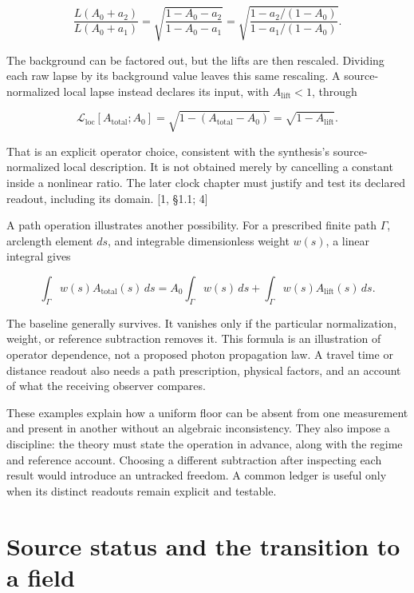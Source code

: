 \documentclass[10pt,twocolumn,letterpaper]{article}
\begin{document}
\begin{equation}
\frac{L(A_0+a_2)}{L(A_0+a_1)}
=\sqrt{\frac{1-A_0-a_2}{1-A_0-a_1}}
=\sqrt{\frac{1-a_2/(1-A_0)}{1-a_1/(1-A_0)}}.
\end{equation}

The background can be factored out, but the lifts are then rescaled. Dividing each raw lapse by its background value leaves this same rescaling. A source-normalized local lapse instead declares its input, with \(A_{\mathrm{lift}}<1\), through

\begin{equation}
\mathcal L_{\mathrm{loc}}[A_{\mathrm{total}};A_0]
=\sqrt{1-(A_{\mathrm{total}}-A_0)}
=\sqrt{1-A_{\mathrm{lift}}}.
\end{equation}

That is an explicit operator choice, consistent with the synthesis's source-normalized local description. It is not obtained merely by cancelling a constant inside a nonlinear ratio. The later clock chapter must justify and test its declared readout, including its domain. {[}1, §1.1; 4{]}

A path operation illustrates another possibility. For a prescribed finite path \(\Gamma\), arclength element \(ds\), and integrable dimensionless weight \(w(s)\), a linear integral gives

\begin{equation}
\int_\Gamma w(s)A_{\mathrm{total}}(s)\,ds
=A_0\int_\Gamma w(s)\,ds
+\int_\Gamma w(s)A_{\mathrm{lift}}(s)\,ds.
\end{equation}

The baseline generally survives. It vanishes only if the particular normalization, weight, or reference subtraction removes it. This formula is an illustration of operator dependence, not a proposed photon propagation law. A travel time or distance readout also needs a path prescription, physical factors, and an account of what the receiving observer compares.

These examples explain how a uniform floor can be absent from one measurement and present in another without an algebraic inconsistency. They also impose a discipline: the theory must state the operation in advance, along with the regime and reference account. Choosing a different subtraction after inspecting each result would introduce an untracked freedom. A common ledger is useful only when its distinct readouts remain explicit and testable.

\section{Source status and the transition to a field}\label{source-status-and-the-transition-to-a-field}
\end{document}
